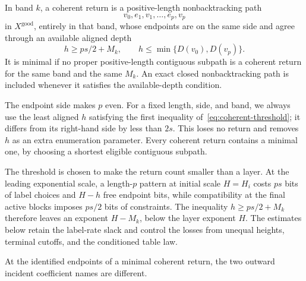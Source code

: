 \begin{definition}
\label{def:coherent-return}
In band $k$, a coherent return is a positive-length nonbacktracking path
\[
  v_0,e_1,v_1,\ldots,e_p,v_p
\]
in $X^{\mathrm{good}}$, entirely in that band, whose endpoints are on
the same side and agree through an available aligned depth
\begin{equation}
\label{eq:coherent-threshold}
 h\geq ps/2+M_k,
 \qquad h\leq\min\{D(v_0),D(v_p)\}.
\end{equation}
It is minimal if no proper positive-length contiguous subpath is a
coherent return for the same band and the same $M_k$.
An exact closed nonbacktracking path is included whenever it satisfies
the available-depth condition.
\end{definition}

The endpoint side makes $p$ even.  For a fixed length, side, and band,
we always use the least aligned $h$ satisfying the first inequality
of~\eqref{eq:coherent-threshold}; it differs from its right-hand side by
less than $2s$.  This loses no return and removes $h$ as an extra
enumeration parameter.  Every coherent return contains a minimal one,
by choosing a shortest eligible contiguous subpath.

The threshold is chosen to make the return count smaller than a layer.
At the leading exponential scale, a length-$p$ pattern at initial scale
$H=H_i$ costs $ps$ bits of label choices and $H-h$ free endpoint bits,
while compatibility at the final active blocks imposes $ps/2$ bits of
constraints.  The
inequality $h\geq ps/2+M_k$ therefore leaves an exponent $H-M_k$,
below the layer exponent $H$.  The estimates below retain the label-rate
slack and control the losses from unequal heights, terminal cutoffs,
and the conditioned table law.

\begin{lemma}
\label{lem:coherent-junction}
At the identified endpoints of a minimal coherent return, the two
outward incident coefficient names are different.
\end{lemma}

